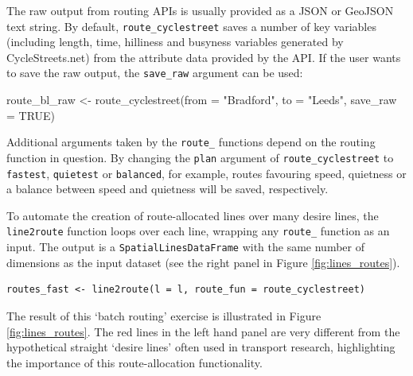 The raw output from routing APIs is usually provided as a JSON or
GeoJSON text string. By default, \texttt{route\_cyclestreet} saves a
number of key variables (including length, time, hilliness and busyness
variables generated by CycleStreets.net) from the attribute data
provided by the API. If the user wants to save the raw output, the
\texttt{save\_raw} argument can be used:

\begin{Schunk}
\begin{Sinput}
route_bl_raw <- route_cyclestreet(from = "Bradford", to = "Leeds", save_raw = TRUE)
\end{Sinput}
\end{Schunk}

Additional arguments taken by the \texttt{route\_} functions depend on
the routing function in question. By changing the \texttt{plan} argument
of \texttt{route\_cyclestreet} to \texttt{fastest}, \texttt{quietest} or
\texttt{balanced}, for example, routes favouring speed, quietness or a
balance between speed and quietness will be saved, respectively.

To automate the creation of route-allocated lines over many desire
lines, the \texttt{line2route} function loops over each line, wrapping
any \texttt{route\_} function as an input. The output is a
\texttt{SpatialLinesDataFrame} with the same number of dimensions as the
input dataset (see the right panel in Figure \ref{fig:lines_routes}).

\begin{verbatim}
routes_fast <- line2route(l = l, route_fun = route_cyclestreet)
\end{verbatim}

The result of this `batch routing' exercise is illustrated in Figure
\ref{fig:lines_routes}. The red lines in the left hand panel are very
different from the hypothetical straight `desire lines' often used in
transport research, highlighting the importance of this route-allocation
functionality.

